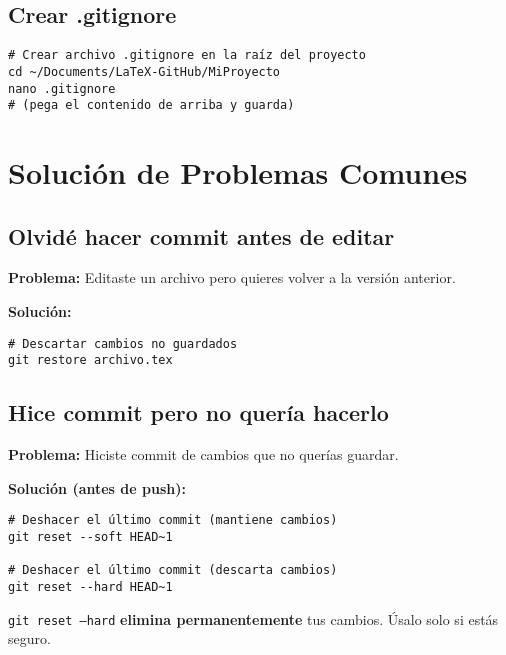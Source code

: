 \documentclass[12pt,a4paper]{article}
\begin{document}
\subsection{Crear .gitignore}

\begin{lstlisting}[style=bashstyle]
# Crear archivo .gitignore en la raíz del proyecto
cd ~/Documents/LaTeX-GitHub/MiProyecto
nano .gitignore
# (pega el contenido de arriba y guarda)
\end{lstlisting}

\section{Solución de Problemas Comunes}

\subsection{Olvidé hacer commit antes de editar}

\textbf{Problema:} Editaste un archivo pero quieres volver a la versión anterior.

\textbf{Solución:}
\begin{lstlisting}[style=bashstyle]
# Descartar cambios no guardados
git restore archivo.tex
\end{lstlisting}

\subsection{Hice commit pero no quería hacerlo}

\textbf{Problema:} Hiciste commit de cambios que no querías guardar.

\textbf{Solución (antes de push):}
\begin{lstlisting}[style=bashstyle]
# Deshacer el último commit (mantiene cambios)
git reset --soft HEAD~1

# Deshacer el último commit (descarta cambios)
git reset --hard HEAD~1
\end{lstlisting}

\begin{warningbox}
\texttt{git reset --hard} \textbf{elimina permanentemente} tus cambios. Úsalo solo si estás seguro.
\end{warningbox}
\end{document}
